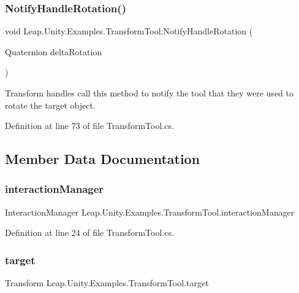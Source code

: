 \subsubsection{\texorpdfstring{NotifyHandleRotation()}{NotifyHandleRotation()}}
{\footnotesize\ttfamily void Leap.\+Unity.\+Examples.\+Transform\+Tool.\+Notify\+Handle\+Rotation (\begin{DoxyParamCaption}\item[{Quaternion}]{delta\+Rotation }\end{DoxyParamCaption})}



Transform handles call this method to notify the tool that they were used to rotate the target object. 



Definition at line 73 of file Transform\+Tool.\+cs.



\subsection{Member Data Documentation}
\mbox{\label{class_leap_1_1_unity_1_1_examples_1_1_transform_tool_a1f8ec4a33ca6ea96981de9df4eaa2088}} 
\subsubsection{\texorpdfstring{interactionManager}{interactionManager}}
{\footnotesize\ttfamily Interaction\+Manager Leap.\+Unity.\+Examples.\+Transform\+Tool.\+interaction\+Manager}



Definition at line 24 of file Transform\+Tool.\+cs.

\mbox{\label{class_leap_1_1_unity_1_1_examples_1_1_transform_tool_a51bd483e751697c0141bb388a254f655}} 
\subsubsection{\texorpdfstring{target}{target}}
{\footnotesize\ttfamily Transform Leap.\+Unity.\+Examples.\+Transform\+Tool.\+target}



